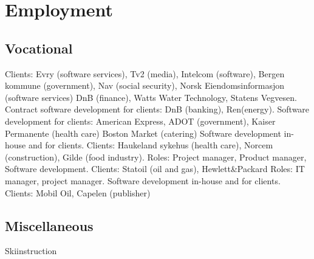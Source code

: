 \documentclass[11pt,a4paper,sans]{moderncv} %
\begin{document}
\pagebreak

\section{Employment}
\subsection{Vocational}
{\newline{}}
{Clients: Evry (software services), Tv2 (media), Intelcom (software), Bergen kommune (government), Nav (social security), Norsk Eiendomsinformasjon (software services) DnB (finance), Watts Water Technology, Statens Vegvesen.
}
{\newline{}}
{Contract software development for clients: DnB (banking), Ren(energy).}
{\newline{}}
{Software development for clients: American Express, ADOT (government), Kaiser Permanente (health care) Boston Market (catering)}
{\newline{}}
{Software development in-house and for clients. Clients: Haukeland sykehus (health care), Norcem (construction), Gilde (food industry).}
{\newline{}}
{Roles: Project manager, Product manager, Software development. Clients: Statoil (oil and gas), Hewlett\&Packard}
{\newline{}}
{Roles: IT manager, project manager.}
{\newline{}}
{Software development in-house and for clients. Clients: Mobil Oil, Capelen (publisher)}
\subsection{Miscellaneous}
{\newline{}}
{Skiinstruction}
{\newline{}}
{}
\end{document}
